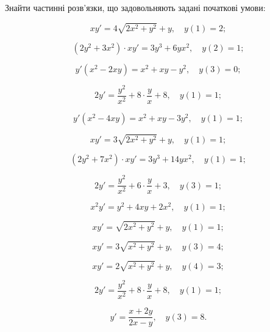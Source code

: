 Знайти частинні розв’язки, що задовольняють задані початкові умови:
\begin{problem}
	\[ x y' = 4 \sqrt{2x^2 + y^2} + y, \quad y(1) = 2; \]
\end{problem}
\begin{problem}
	\[ (2y^2 + 3x^2) \cdot xy' = 3y^3 + 6yx^2, \quad y(2) = 1; \]
\end{problem}
\begin{problem}
	\[ y' (x^2 - 2xy) = x^2 + xy - y^2, \quad y(3) = 0; \]
\end{problem}
\begin{problem}
	\[ 2 y' = \frac{y^2}{x^2} + 8 \cdot \frac{y}{x} + 8, \quad y(1) = 1; \]
\end{problem}
\begin{problem}
	\[ y' (x^2 - 4xy) = x^2 + xy - 3 y^2, \quad y(1) = 1; \]
\end{problem}
\begin{problem}
	\[ xy' = 3 \sqrt{2x^2 + y^2} + y, \quad y(1) = 1; \]
\end{problem}
\begin{problem}
	\[ (2y^2 + 7x^2)\cdot x y' = 3y^3 + 14yx^2, \quad y(1) = 1; \]
\end{problem}
\begin{problem}
	\[ 2y' = \frac{y^2}{x^2} + 6 \cdot \frac{y}{x} + 3, \quad y(3) = 1; \]
\end{problem}
\begin{problem}
	\[ x^2 y' = y^2 + 4xy + 2x^2, \quad y(1) = 1; \]
\end{problem}
\begin{problem}
	\[ xy' = \sqrt{2x^2 + y^2} + y, \quad y(1) = 1; \]
\end{problem}
\begin{problem}
	\[ xy' = 3 \sqrt{x^2 + y^2} + y, \quad y(3) = 4; \]
\end{problem}
\begin{problem}
	\[ xy' = 2 \sqrt{x^2 + y^2} + y, \quad y(4) = 3; \]
\end{problem}
\begin{problem}
	\[ 2y' = \frac{y^2}{x^2} + 8 \cdot \frac{y}{x} + 8, \quad y(1) = 1; \]
\end{problem}
\begin{problem}
	\[ y' = \frac{x + 2y}{2x - y}, \quad y(3) = 8. \]
\end{problem}